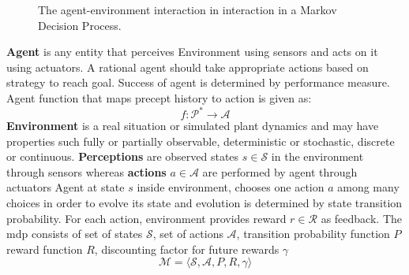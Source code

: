 \begin{figure}[H]
    \centering


    \caption{The agent-environment interaction in  interaction in a Markov Decision Process. \cite{sutton2018reinforcement}}
    \label{fig:ai_agent_env_mdp}
\end{figure}


\noindent\textbf{\Gls{Agent}} is any entity that perceives \gls{Environment} using sensors and acts on it using actuators. A rational agent should take appropriate actions based on strategy to reach goal. Success of agent is determined by performance measure.
Agent function that maps precept history to action is given as:
\begin{equation}
    f: \mathcal{P}^*\longrightarrow \mathcal{A}
\end{equation}
\textbf{Environment} is a real situation or simulated plant dynamics and may have properties such fully or partially observable, deterministic or stochastic, discrete or continuous.
\textbf{Perceptions} are observed states $s\in \mathcal{S}$ in the environment through sensors whereas \textbf{actions} $a\in \mathcal{A}$ are performed by agent through actuators
Agent at \gls{state} $s$ inside environment, chooses one action $a$ among many choices in order to evolve its state and evolution is determined by state transition probability. For each action, environment provides reward $r \in \mathcal{R}$ as feedback. The \acrfull{mdp} consists of set of states $\mathcal{S}$, set of actions $\mathcal{A}$, transition probability function $P$ reward function $R$, discounting factor for future rewards $\gamma$
\begin{equation*}
    \mathcal{M} = \langle \mathcal{S}, \mathcal{A}, P, R, \gamma \rangle
\end{equation*}

